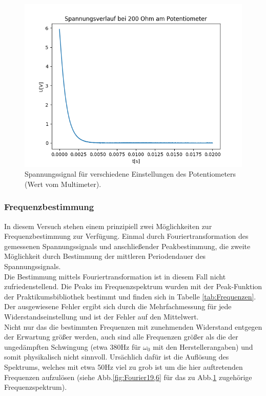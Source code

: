 \documentclass[12pt,a4paper]{article}
\begin{document}
\begin{figure}
\begin{center}
\includegraphics[scale=0.5]{Bilder/Spannungsverlauf200}
\end{center}
\caption[Spannungsverlauf]{Spannungssignal für verschiedene Einstellungen des Potentiometers (Wert vom Multimeter).}
\label{fig:Spannung19,6}
\end{figure}



\subsubsection{Frequenzbestimmung}
In diesem Versuch stehen einem prinzipiell zwei Möglichkeiten zur Frequenzbestimmung zur Verfügung.
Einmal durch Fouriertransformation des gemessenen Spannungssignals und anschließender Peakbestimmung, die zweite Möglichkeit durch Bestimmung der mittleren Periodendauer des Spannungssignals.\\


Die Bestimmung mittels Fouriertransformation ist in diesem Fall nicht zufriedenstellend. Die Peaks im Frequenzspektrum wurden mit der Peak-Funktion der Praktikumsbibliothek bestimmt und finden sich in Tabelle \ref{tab:Frequenzen}. Der ausgewiesene Fehler ergibt sich durch die Mehrfachmessung für jede Widerstandseinstellung und ist der Fehler auf den Mittelwert.\\
Nicht nur das die bestimmten Frequenzen mit zunehmenden Widerstand entgegen der Erwartung größer werden, auch sind alle Frequenzen größer als die der ungedämpften Schwingung (etwa 380Hz für $\omega_0$ mit den Herstellerangaben) und somit physikalisch nicht sinnvoll.
Ursächlich dafür ist die Auflösung des Spektrums, welches mit etwa 50Hz viel zu grob ist um die hier auftretenden Frequenzen aufzulösen (siehe Abb.\ref{fig:Fourier19,6} für das zu Abb.\ref{fig:Spannung19,6} zugehörige Frequenzspektrum).\\
\end{document}
